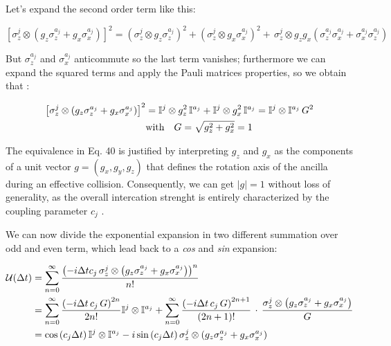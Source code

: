 \documentclass[a4paper,12pt]{article}
\begin{document}
	Let's expand the second order term like this:
	
	\begin{equation}
		{\left[\sigma_{z}^{j} \otimes \left(g_{z} \sigma_{z}^{a_j} + g_{x} \sigma_{x}^{a_j} \right)\right]}^{2} = {\left(\sigma_{z}^{j} \otimes g_{z} \sigma_{z}^{a_j} \right)}^{2} + {\left(\sigma_{z}^{j} \otimes g_{x} \sigma_{x}^{a_j} \right)}^{2} + \, \sigma_{z}^{j} \otimes g_{z}g_{x}\left( \sigma_{z}^{a_j}\sigma_{x}^{a_j} + \sigma_{x}^{a_j}\sigma_{z}^{a_j} \right)
	\end{equation}
	
	\begin{flushleft}
		But $ \sigma_{z}^{a_j} $ and $ \sigma_{x}^{a_j} $ anticommute so the last term vanishes; furthermore we can expand the squared terms and apply the Pauli matrices properties, so we obtain that :
	\end{flushleft}
	  
	\begin{align}
		{\left[\sigma_{z}^{j} \otimes \left(g_{z} \sigma_{z}^{a_j} + g_{x} \sigma_{x}^{a_j} \right)\right]}^{2} &= \mathbb{I}^{j} \otimes g_{z}^{2} \, \mathbb{I}^{a_j} + \mathbb{I}^{j} \otimes g_{x}^{2} \, \mathbb{I}^{a_j}
		= \mathbb{I}^{j} \otimes \mathbb{I}^{a_j} \, G^{2} \\ 
		& \text{with} \quad G = \sqrt{g_{z}^{2} + g_{x}^{2}} =1 \notag
	\end{align}
	
	\begin{flushleft}
		The equivalence in Eq. 40 is justified by interpreting $ g_z $ and $ g_x $ as the components of a unit vector $ g = \left(g_x, g_y, g_z \right) $ that defines the rotation axis of the ancilla during an effective collision. Consequently, we can get $ |g| = 1 $ without loss of generality, as the overall intercation strenght is entirely characterized by the coupling parameter $ c_j $ . 
	\end{flushleft}

	 \begin{flushleft}
	 	 We can now divide the exponential expansion in two different summation over odd  and even term, which lead back to a \textit{cos} and \textit{sin} expansion:	
	 \end{flushleft}
		 
	 \begin{align}
	 	\mathcal{U}(\Delta t) &= \sum_{n=0}^{\infty}{\frac{\left(-i \Delta t c_{j} \, \sigma_{z}^{j} \otimes \left(g_{z} \sigma_{z}^{a_j} + g_{x} \sigma_{x}^{a_j} \right) \right)^n}{n!}} \notag \\
	 	&= \sum_{n=0}^{\infty}{\frac{\left(-i \Delta t \, c_{j} \, G \right)^{2n}}{2n!} \mathbb{I}^{j} \otimes \mathbb{I}^{a_j} } + \sum_{n=0}^{\infty}{\frac{\left(-i \Delta t \, c_{j} \, G \right)^{2n+1}}{(2n+1)!} \, \cdot \, \frac{\sigma_{z}^{j} \otimes \left(g_{z} \sigma_{z}^{a_j} + g_{x} \sigma_{x}^{a_j} \right)}{G} } \notag \\
	 	&= \cos{\left(c_{j} \Delta t \right)} \, \mathbb{I}^{j} \otimes \mathbb{I}^{a_j} -i \sin{\left(c_{j} \Delta t \right)} \, \sigma_{z}^{j} \otimes \left(g_{z} \sigma_{z}^{a_j} + g_{x} \sigma_{x}^{a_j} \right)
	  \end{align}
	  
\end{document}
